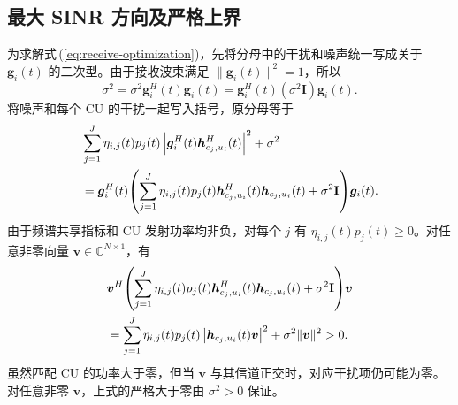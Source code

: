 \documentclass[11pt,a4paper]{ctexart}
\begin{document}
\subsection{最大 SINR 方向及严格上界}
为求解式\,(\ref{eq:receive-optimization})，先将分母中的干扰和噪声统一写成关于 $\bm g_i(t)$ 的二次型。由于接收波束满足 $\|\bm g_i(t)\|^2=1$，所以
\begin{equation}
\sigma^2=\sigma^2\bm g_i^H(t)\bm g_i(t)
=\bm g_i^H(t)(\sigma^2\mathbf I)\bm g_i(t).
\end{equation}
将噪声和每个 CU 的干扰一起写入括号，原分母等于
\begin{align}\label{eq:denominator}
&\sum_{j=1}^J\eta_{i,j}(t)p_j(t)
\left|\bm g_i^H(t)\bm h_{c_j,u_i}^{H}(t)\right|^2+\sigma^2\notag\\
&=\bm g_i^H(t)\!\left(\sum_{j=1}^J\eta_{i,j}(t)p_j(t)
\bm h_{c_j,u_i}^{H}(t)\bm h_{c_j,u_i}(t)+\sigma^2\mathbf I\right)\!\bm g_i(t).
\end{align}
由于频谱共享指标和 CU 发射功率均非负，对每个 $j$ 有 $\eta_{i,j}(t)p_j(t)\ge0$。对任意非零向量 $\bm v\in\mathbb C^{N\times1}$，有
\begin{align}
&\bm v^H\!\left(\sum_{j=1}^J\eta_{i,j}(t)p_j(t)
\bm h_{c_j,u_i}^{H}(t)\bm h_{c_j,u_i}(t)+\sigma^2\mathbf I\right)\!\bm v\notag\\
&=\sum_{j=1}^J\eta_{i,j}(t)p_j(t)
\left|\bm h_{c_j,u_i}(t)\bm v\right|^2+\sigma^2\|\bm v\|^2>0.
\end{align}
虽然匹配 CU 的功率大于零，但当 $\bm v$ 与其信道正交时，对应干扰项仍可能为零。对任意非零 $\bm v$，上式的严格大于零由 $\sigma^2>0$ 保证。
\end{document}
